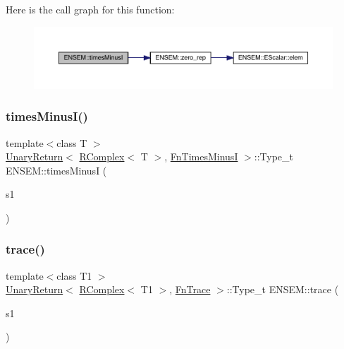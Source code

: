 Here is the call graph for this function\+:\nopagebreak
\begin{figure}[H]
\begin{center}
\leavevmode
\includegraphics[width=350pt]{da/dc7/group__rcomplex_gaf58bc5b02a5a7fed1251f5ad0f33325a_cgraph}
\end{center}
\end{figure}
\mbox{\label{group__rcomplex_ga630dbd8479e9fe488cbf493531594f06}} 
\subsubsection{\texorpdfstring{timesMinusI()}{timesMinusI()}\hspace{0.1cm}{\footnotesize\ttfamily [2/2]}}
{\footnotesize\ttfamily template$<$class T $>$ \\
\mbox{\hyperlink{structENSEM_1_1UnaryReturn}{Unary\+Return}}$<$ \mbox{\hyperlink{classENSEM_1_1RComplex}{R\+Complex}}$<$ T $>$, \mbox{\hyperlink{structENSEM_1_1FnTimesMinusI}{Fn\+Times\+MinusI}} $>$\+::Type\+\_\+t E\+N\+S\+E\+M\+::times\+MinusI (\begin{DoxyParamCaption}\item[{const \mbox{\hyperlink{classENSEM_1_1RComplex}{R\+Complex}}$<$ T $>$ \&}]{s1 }\end{DoxyParamCaption})\hspace{0.3cm}{\ttfamily [inline]}}

\mbox{\label{group__rcomplex_ga9f6f9e69dbfccacb954b9fd9947ca592}} 
\subsubsection{\texorpdfstring{trace()}{trace()}}
{\footnotesize\ttfamily template$<$class T1 $>$ \\
\mbox{\hyperlink{structENSEM_1_1UnaryReturn}{Unary\+Return}}$<$ \mbox{\hyperlink{classENSEM_1_1RComplex}{R\+Complex}}$<$ T1 $>$, \mbox{\hyperlink{structENSEM_1_1FnTrace}{Fn\+Trace}} $>$\+::Type\+\_\+t E\+N\+S\+E\+M\+::trace (\begin{DoxyParamCaption}\item[{const \mbox{\hyperlink{classENSEM_1_1RComplex}{R\+Complex}}$<$ T1 $>$ \&}]{s1 }\end{DoxyParamCaption})\hspace{0.3cm}{\ttfamily [inline]}}

